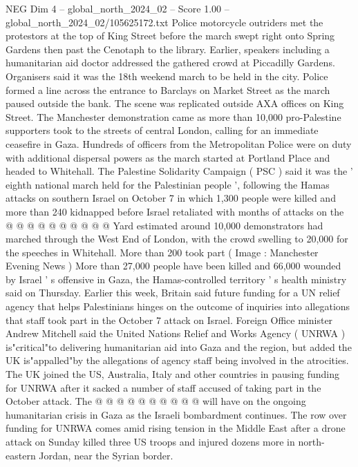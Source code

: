 \begin{textsample}{NEG Dim 4 – global\_north\_2024\_02 – Score 1.00 – global\_north\_2024\_02/105625172.txt}  \label{ex:f4_neg_289}
Police motorcycle outriders met the protestors at the top of King Street before the march swept right onto Spring Gardens then past the Cenotaph to the library.
Earlier, speakers including a humanitarian aid doctor addressed the gathered crowd at Piccadilly Gardens.
Organisers said it was the 18th weekend march to be held in the city.
Police formed a line across the entrance to Barclays on Market Street as the march paused outside the bank.
The scene was replicated outside AXA offices on King Street.
The Manchester demonstration came as more than 10,000 pro-Palestine supporters took to the streets of central London, calling for an immediate ceasefire in Gaza.
Hundreds of officers from the Metropolitan Police were on duty with additional dispersal powers as the march started at Portland Place and headed to Whitehall.
The Palestine Solidarity Campaign ( PSC ) said it was the ' eighth national march held for the Palestinian people ', following the Hamas attacks on southern Israel on October 7 in which 1,300 people were killed and more than 240 kidnapped before Israel retaliated with months of attacks on the @ @ @ @ @ @ @ @ @ @ Yard estimated around 10,000 demonstrators had marched through the West End of London, with the crowd swelling to 20,000 for the speeches in Whitehall.
More than 200 took part ( Image : Manchester Evening News ) More than 27,000 people have been killed and 66,000 wounded by Israel ' s offensive in Gaza, the Hamas-controlled territory ' s health ministry said on Thursday.
Earlier this week, Britain said future funding for a UN relief agency that helps Palestinians hinges on the outcome of inquiries into allegations that staff took part in the October 7 attack on Israel.
Foreign Office minister Andrew Mitchell said the United Nations Relief and Works Agency ( UNRWA ) is"critical"to delivering humanitarian aid into Gaza and the region, but added the UK is"appalled"by the allegations of agency staff being involved in the atrocities.
The UK joined the US, Australia, Italy and other countries in pausing funding for UNRWA after it sacked a number of staff accused of taking part in the October attack.
The @ @ @ @ @ @ @ @ @ @ will have on the ongoing humanitarian crisis in Gaza as the Israeli bombardment continues.
The row over funding for UNRWA comes amid rising tension in the Middle East after a drone attack on Sunday killed three US troops and injured dozens more in north-eastern Jordan, near the Syrian border.

\end{textsample}
